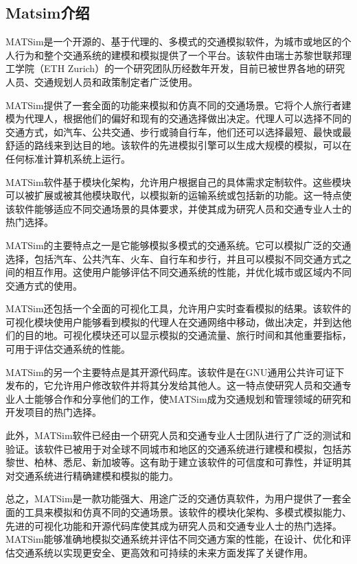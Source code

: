 \subsection{Matsim介绍}

MATSim是一个开源的、基于代理的、多模式的交通模拟软件，为城市或地区的个人行为和整个交通系统的建模和模拟提供了一个平台。该软件由瑞士苏黎世联邦理工学院（ETH Zurich）的一个研究团队历经数年开发，目前已被世界各地的研究人员、交通规划人员和政策制定者广泛使用。

MATSim提供了一套全面的功能来模拟和仿真不同的交通场景。它将个人旅行者建模为代理人，根据他们的偏好和现有的交通选择做出决定。代理人可以选择不同的交通方式，如汽车、公共交通、步行或骑自行车，他们还可以选择最短、最快或最舒适的路线来到达目的地。该软件的先进模拟引擎可以生成大规模的模拟，可以在任何标准计算机系统上运行。

MATSim软件基于模块化架构，允许用户根据自己的具体需求定制软件。这些模块可以被扩展或被其他模块取代，以模拟新的运输系统或包括新的功能。这一特点使该软件能够适应不同交通场景的具体要求，并使其成为研究人员和交通专业人士的热门选择。

MATSim的主要特点之一是它能够模拟多模式的交通系统。它可以模拟广泛的交通选择，包括汽车、公共汽车、火车、自行车和步行，并且可以模拟不同交通方式之间的相互作用。这使用户能够评估不同交通系统的性能，并优化城市或区域内不同交通方式的使用。

MATSim还包括一个全面的可视化工具，允许用户实时查看模拟的结果。该软件的可视化模块使用户能够看到模拟的代理人在交通网络中移动，做出决定，并到达他们的目的地。可视化模块还可以显示模拟的交通流量、旅行时间和其他重要指标，可用于评估交通系统的性能。

MATSim的另一个主要特点是其开源代码库。该软件是在GNU通用公共许可证下发布的，它允许用户修改软件并将其分发给其他人。这一特点使研究人员和交通专业人士能够合作和分享他们的工作，使MATSim成为交通规划和管理领域的研究和开发项目的热门选择。

此外，MATSim软件已经由一个研究人员和交通专业人士团队进行了广泛的测试和验证。该软件已被用于对全球不同城市和地区的交通系统进行建模和模拟，包括苏黎世、柏林、悉尼、新加坡等。这有助于建立该软件的可信度和可靠性，并证明其对交通系统进行精确建模和模拟的能力。

总之，MATSim是一款功能强大、用途广泛的交通仿真软件，为用户提供了一套全面的工具来模拟和仿真不同的交通场景。该软件的模块化架构、多模式模拟能力、先进的可视化功能和开源代码库使其成为研究人员和交通专业人士的热门选择。MATSim能够准确地模拟交通系统并评估不同交通方案的性能，在设计、优化和评估交通系统以实现更安全、更高效和可持续的未来方面发挥了关键作用。


